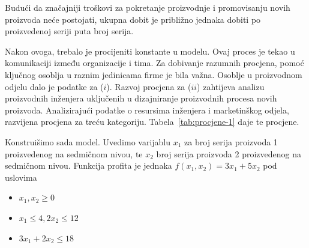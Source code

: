 \documentclass[a4paper, utf8, 11pt, colorlinks]{article}
\begin{document}
Budući da značajniji troškovi za pokretanje
 proizvodnje i promovisanju novih proizvoda neće postojati, ukupna dobit je približno jednaka dobiti po proizvedenoj seriji puta broj serija.  

Nakon ovoga, trebalo je procijeniti konstante u modelu. Ovaj proces je tekao u komunikaciji između organizacije i tima. 
Za dobivanje razumnih procjena, pomoć ključnog osoblja u raznim jedinicama firme je bila važna. Osoblje u proizvodnom odjelu dalo je podatke za ($i$). Razvoj procjena za ($ii$) zahtijeva analizu proizvodnih inženjera uključenih u dizajniranje proizvodnih procesa novih proizvoda. Analizirajući podatke o resursima inženjera i marketinškog odjela,  razvijena procjena za treću kategoriju. Tabela~\ref{tab:procjene-1} daje te procjene. 


\begin{table}[!ht]
    \centering
    \caption{Procjene konstanti modela.}
    \label{tab:procjene-1}
\end{table}

Konstruišimo sada model. Uvedimo varijablu $x_1$ za broj serija proizvoda 1 proizvedenog na sedmičnom nivou, te $x_2$ broj serija proizvoda 2 proizvedenog na sedmičnom nivou. Funkcija profita je jednaka $f(x_1, x_2) = 3 x_1 + 5 x_2$ pod uslovima
\begin{itemize}
    \item $x_1, x_2 \geq 0$
    \item  $x_1 \leq 4, 2 x_2 \leq 12$
    \item $3 x_1 + 2 x_2 \leq 18$
\end{itemize}
\end{document}
